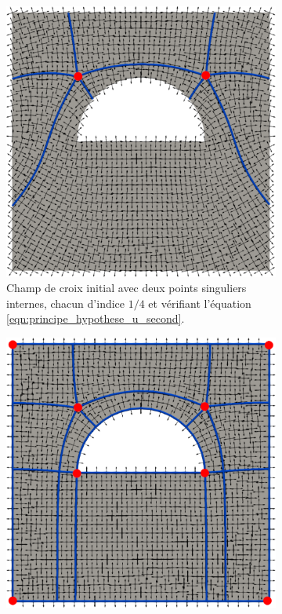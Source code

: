\begin{figure}[!h]
\centering
\begin{subfigure}{0.495\textwidth}
    \includegraphics[width=\textwidth]{images/carre_demi_disc_vide_bon_first.pdf}
    \caption{Champ de croix initial avec deux points singuliers internes, chacun d'indice $1/4$ et vérifiant l'équation \ref{eqn:principe_hypothese_u_second}.}
    \label{fig:carre_demi_disc_vide_bon_first}
\end{subfigure}
\hfill
\begin{subfigure}{0.495\textwidth}
    \includegraphics[width=\textwidth]{images/carre_demi_disc_vide_bon_second.pdf}

\end{subfigure}
\end{figure}
